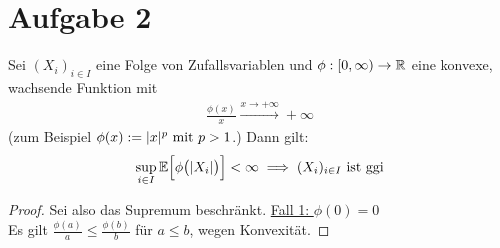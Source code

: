 \documentclass[12pt,a4paper]{article}
\begin{document}
\section*{Aufgabe 2}
Sei $(X_i)_{i\in I}$ eine Folge von Zufallsvariablen und $\phi:[0,\infty)\to\R$ eine konvexe, wachsende Funktion mit 
\begin{align*}
\frac{\phi(x)}{x}\stackrel{x\to+\infty}{\longrightarrow}+\infty
\end{align*}
(zum Beispiel $\phi(x):=|x|^p\mit p>1$.) Dann gilt:
\begin{align*}
\sup\limits_{i\in I}\E\Big[\phi\big(|X_i|\big)\Big]<\infty\implies(X_i)_{i\in I}\text{ ist ggi}
\end{align*}
\begin{proof}
Sei also das Supremum beschränkt.\nl
\underline{Fall 1: $\phi(0)=0$}\\
Es gilt $\frac{\phi(a)}{a}\leq\frac{\phi(b)}{b}$ für $a\leq b$, wegen Konvexität. %


\end{proof}
\end{document}
